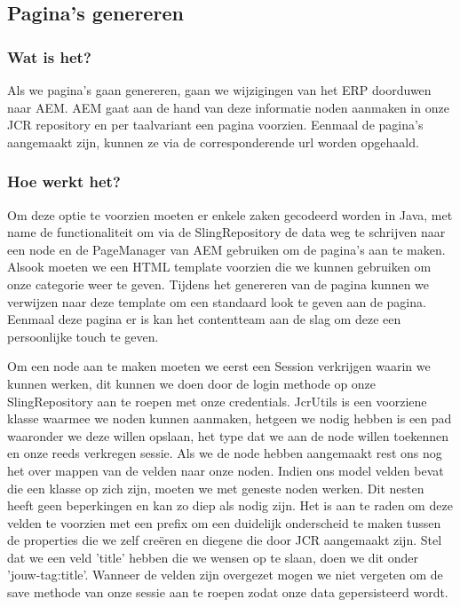 \documentclass{article}
\begin{document}
	\subsection{Pagina's genereren} 
	\subsubsection{Wat is het?}
	Als we pagina's gaan genereren, gaan we wijzigingen van het ERP doorduwen naar AEM. AEM gaat aan de hand van deze informatie noden aanmaken in onze JCR repository en per taalvariant een pagina voorzien. Eenmaal de pagina's aangemaakt zijn, kunnen ze via de corresponderende url worden opgehaald.
	\subsubsection{Hoe werkt het?}
	Om deze optie te voorzien moeten er enkele zaken gecodeerd worden in Java, met name de functionaliteit om via de SlingRepository de data weg te schrijven naar een node en de PageManager van AEM gebruiken om de pagina's aan te maken. Alsook moeten we een HTML template voorzien die we kunnen gebruiken om onze categorie weer te geven. Tijdens het genereren van de pagina kunnen we verwijzen naar deze template om een standaard look te geven aan de pagina. Eenmaal deze pagina er is kan het contentteam aan de slag om deze een persoonlijke touch te geven.
	\par
	Om een node aan te maken moeten we eerst een Session verkrijgen waarin we kunnen werken, dit kunnen we doen door de login methode op onze SlingRepository aan te roepen met onze credentials. JcrUtils is een voorziene klasse waarmee we noden kunnen aanmaken, hetgeen we nodig hebben is een pad waaronder we deze willen opslaan, het type dat we aan de node willen toekennen en onze reeds verkregen sessie. Als we de node hebben aangemaakt rest ons nog het over mappen van de velden naar onze noden. Indien ons model velden bevat die een klasse op zich zijn, moeten we met geneste noden werken. Dit nesten heeft geen beperkingen en kan zo diep als nodig zijn. Het is aan te raden om deze velden te voorzien met een prefix om een duidelijk onderscheid te maken tussen de properties die we zelf cre\"eren en diegene die door JCR aangemaakt zijn. Stel dat we een veld 'title' hebben die we wensen op te slaan, doen we dit onder 'jouw-tag:title'. Wanneer de velden zijn overgezet mogen we niet vergeten om de save methode van onze sessie aan te roepen zodat onze data gepersisteerd wordt.
	\par
\end{document}
